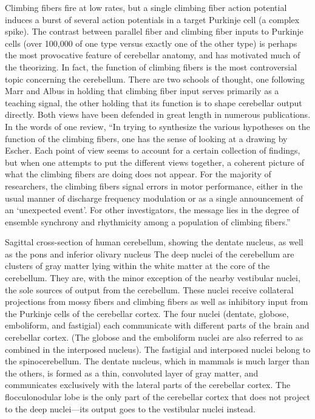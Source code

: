 \documentclass[]{book}
\begin{document}
Climbing fibers fire at low rates, but a single climbing fiber action potential induces a burst of several action potentials in a target Purkinje cell (a complex spike). The contrast between parallel fiber and climbing fiber inputs to Purkinje cells (over 100,000 of one type versus exactly one of the other type) is perhaps the most provocative feature of cerebellar anatomy, and has motivated much of the theorizing. In fact, the function of climbing fibers is the most controversial topic concerning the cerebellum. There are two schools of thought, one following Marr and Albus in holding that climbing fiber input serves primarily as a teaching signal, the other holding that its function is to shape cerebellar output directly. Both views have been defended in great length in numerous publications. In the words of one review, ``In trying to synthesize the various hypotheses on the function of the climbing fibers, one has the sense of looking at a drawing by Escher. Each point of view seems to account for a certain collection of findings, but when one attempts to put the different views together, a coherent picture of what the climbing fibers are doing does not appear. For the majority of researchers, the climbing fibers signal errors in motor performance, either in the usual manner of discharge frequency modulation or as a single announcement of an `unexpected event'. For other investigators, the message lies in the degree of ensemble synchrony and rhythmicity among a population of climbing fibers.''

Sagittal cross-section of human cerebellum, showing the dentate nucleus, as well as the pons and inferior olivary nucleus
The deep nuclei of the cerebellum are clusters of gray matter lying within the white matter at the core of the cerebellum. They are, with the minor exception of the nearby vestibular nuclei, the sole sources of output from the cerebellum. These nuclei receive collateral projections from mossy fibers and climbing fibers as well as inhibitory input from the Purkinje cells of the cerebellar cortex. The four nuclei (dentate, globose, emboliform, and fastigial) each communicate with different parts of the brain and cerebellar cortex. (The globose and the emboliform nuclei are also referred to as combined in the interposed nucleus). The fastigial and interposed nuclei belong to the spinocerebellum. The dentate nucleus, which in mammals is much larger than the others, is formed as a thin, convoluted layer of gray matter, and communicates exclusively with the lateral parts of the cerebellar cortex. The flocculonodular lobe is the only part of the cerebellar cortex that does not project to the deep nuclei---its output goes to the vestibular nuclei instead.
\end{document}
